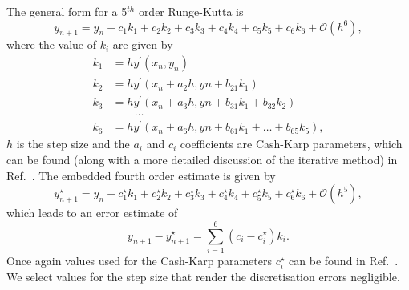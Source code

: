 \documentclass[a4paper]{article}
\begin{document}
The general form for a 5$^{th}$ order Runge-Kutta is
%
\begin{equation}
y_{n+1} = y_{n} + c_{1}k_{1} + c_{2}k_{2} + c_{3}k_{3} + c_{4}k_{4} + c_{5}k_{5} + c_{6}k_{6} + \mathcal{O}(h^6),
\end{equation}
%
where the value of $k_{i}$ are given by
%
\begin{align}
k_{1} &= hy^{\prime}(x_{n},y_{n})\nonumber\\
k_{2} &= hy^{\prime}(x_{n} + a_{2}h,y{n} + b_{21}k_{1})\nonumber\\
k_{3} &= hy^{\prime}(x_{n} + a_{3}h,y{n} + b_{31}k_{1} + b_{32}k_{2})\nonumber\\
&\qquad\ldots\nonumber\\
k_{6} &= hy^{\prime}(x_{n} + a_{6}h,y{n} + b_{61}k_{1} + \ldots + b_{65}k_{5}),
\end{align}
%
$h$ is the step size and the $a_{i}$ and $c_{i}$ coefficients are Cash-Karp parameters, which can be found (along with a more detailed discussion of the iterative method) in Ref.~\cite{NumericalRecipes}.  The embedded fourth order estimate is given by
%
\begin{equation}
y^{\star}_{n+1} = y_{n} + c^{\star}_{1}k_{1} + c^{\star}_{2}k_{2} + c^{\star}_{3}k_{3} + c^{\star}_{4}k_{4} + c^{\star}_{5}k_{5} + c^{\star}_{6}k_{6} + \mathcal{O}(h^5),
\end{equation}
%
which leads to an error estimate of
%
\begin{equation}
y_{n+1} - y^{\star}_{n+1} = \sum_{i=1}^{6}(c_{i} - c^{\star}_{i})k_{i}.
\end{equation}
%
Once again values used for the Cash-Karp parameters $c^{\star}_{i}$ can be found in Ref.~\cite{NumericalRecipes}.  We select values for the step size that render the discretisation errors negligible.
\end{document}

